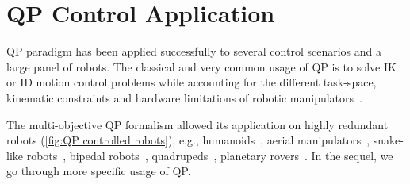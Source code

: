 \section{QP Control Application}
QP paradigm has been applied successfully to several control scenarios and a large panel of robots. %
The classical and very common usage of QP is to solve IK or ID motion control problems while accounting for the different task-space, kinematic constraints and hardware limitations of robotic manipulators~\cite{faverjon1987icra,cheng1994tra,park1998icra,zhang2004transactionsonSysManCyb1,zhang2004transactionsonSysManCyb2,decre2009icra,rubrecht2010iros,delprete2018ral,saveriano2019iros,rauscher2016iros,zanchettin2017elsevier,murtaza2022ral}. 

The multi-objective QP formalism allowed its application on highly redundant robots (\cref{fig:QP controlled robots}), e.g., humanoids~\cite{salini2010springer,saab2013tro,kuindersma2016autonomousRobot,quiroz-omana2019ral,djeha2020ral}, aerial manipulators~\cite{nava2020ral}, snake-like robots~\cite{basso2020ifac}, bipedal robots~\cite{reher2020acc,galloway2015ieeeAccess,ames2013hscc}, quadrupeds~\cite{xin2020frontiers,fahmi2019ral,hamed2020ral}, planetary rovers~\cite{bussmann2018icra}. 
In the sequel, we go through more specific usage of QP.  

